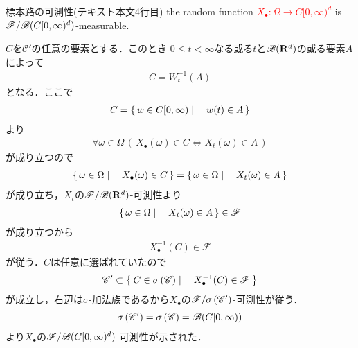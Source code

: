 	\begin{itembox}[l]{標本路の可測性(テキスト本文4行目)}
		the random function \textcolor{red}{$X_\bullet:\Omega \longrightarrow C[0,\infty)^d$}
		is \textcolor{red}{$\mathscr{F}/\mathscr{B}(C[0,\infty)^d)$}-measurable.
	\end{itembox}
	
	\begin{prf}
		$C$を$\mathscr{C}'$の任意の要素とする．このとき
		$0 \leq t < \infty$なる或る$t$と$\mathscr{B}(\mathbf{R}^d)$の或る要素$A$によって
		\begin{align}
			C = W_t^{-1}(A)
		\end{align}
		となる．ここで
		\begin{align}
			C = \left\{\, w \in C[0,\infty) \mid \quad w(t) \in A\, \right\}
		\end{align}
		より
		\begin{align}
			\forall \omega \in \Omega\,
			\left(\, X_\bullet(\omega) \in C \Longleftrightarrow X_t(\omega) \in A\, \right)
		\end{align}
		が成り立つので
		\begin{align}
			\left\{\, \omega \in \Omega \mid \quad X_\bullet(\omega) \in C\, \right\}
			= \left\{\, \omega \in \Omega \mid \quad X_t(\omega) \in A\, \right\}
		\end{align}
		が成り立ち，$X_t$の$\mathscr{F}/\mathscr{B}(\mathbf{R}^d)$-可測性より
		\begin{align}
			\left\{\, \omega \in \Omega \mid \quad X_t(\omega) \in A\, \right\} \in \mathscr{F}
		\end{align}
		が成り立つから
		\begin{align}
			X_{\bullet}^{-1}(C) \in \mathscr{F}
		\end{align}
		が従う．$C$は任意に選ばれていたので
		\begin{align}
			\mathscr{C}' \subset \left\{\, C \in \sigma \left(\mathscr{C}\right) \mid \quad X_{\bullet}^{-1}(C) \in \mathscr{F}\, \right\}
		\end{align}
		が成立し，右辺は$\sigma$-加法族であるから$X_\bullet$の$\mathscr{F}/\sigma \left(\mathscr{C}'\right)$-可測性が従う．
		\begin{align}
			\sigma \left(\mathscr{C}'\right) = \sigma \left(\mathscr{C}\right) = \mathscr{B}(C[0,\infty))
		\end{align}
		より$X_\bullet$の$\mathscr{F}/\mathscr{B}(C[0,\infty)^d)$-可測性が示された．
		\QED
	\end{prf}
	
